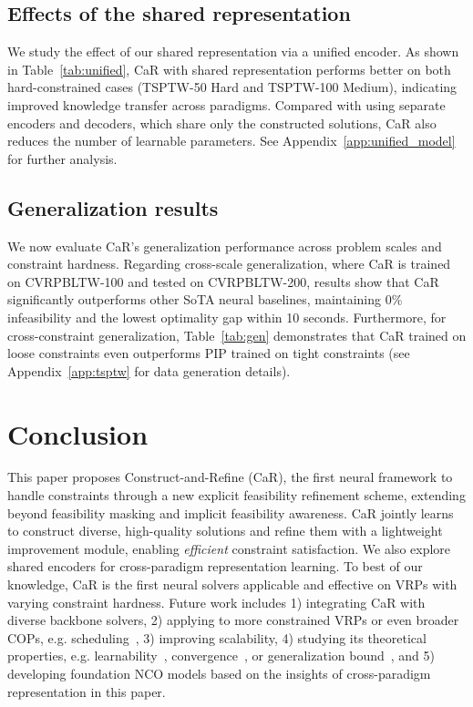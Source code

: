 \documentclass{article} %
\begin{document}
\subsection{{Effects of the shared representation}} 

{We study the effect of our shared representation via a unified encoder. As shown in Table~\ref{tab:unified}, CaR with shared representation performs better on both hard-constrained cases (TSPTW-50 Hard and TSPTW-100 Medium), indicating improved knowledge transfer across paradigms. Compared with using separate encoders and decoders, which share only the constructed solutions, CaR also reduces the number of learnable parameters. See Appendix~\ref{app:unified_model} for further analysis.}


\subsection{{Generalization results}}

{We now evaluate CaR's generalization performance across problem scales and constraint hardness. Regarding {cross-scale generalization}, where CaR is trained on CVRPBLTW-100 and tested on CVRPBLTW-200, results show that CaR significantly outperforms other {SoTA} neural baselines, maintaining 0\% infeasibility and the lowest optimality gap within 10 seconds. Furthermore, for {cross-constraint generalization}, Table~\ref{tab:gen} demonstrates that CaR trained on loose constraints even outperforms PIP trained on tight constraints (see Appendix~\ref{app:tsptw} for data generation details).}


\section{Conclusion}
\label{conclusion}
{This paper proposes Construct-and-Refine (CaR), the first neural framework to handle constraints through a new explicit feasibility refinement scheme, extending beyond feasibility masking and implicit feasibility awareness. CaR jointly learns to construct diverse, high-quality solutions and refine them with a lightweight improvement module, enabling \textit{efficient} constraint satisfaction. We also explore shared encoders for cross-paradigm representation learning. To best of our knowledge, CaR is the first neural solvers applicable and effective on VRPs with varying constraint hardness.} {Future work includes 1) integrating CaR with diverse backbone solvers, 2) applying to more constrained VRPs or even broader COPs, e.g. scheduling~\citep{zhangcong2020learning,zhang2024deep,andelfinger2025learning}, 3) improving scalability, 4) studying its theoretical properties, e.g. learnability~\citep{yuan2022general}, convergence~\citep{thoma2024contextual}, or generalization bound~\citep{duan2021risk}, and 5) developing foundation NCO models based on the insights of cross-paradigm representation in this paper.}
\end{document}
